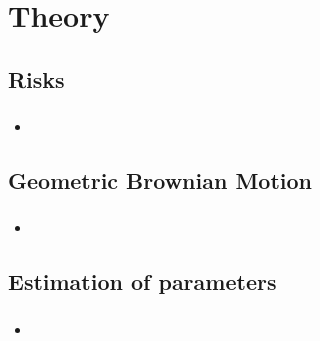\section{Theory}

\subsection{Risks}
\begin{frame}
\frametitle{\insertsection}
\textbf{\insertsubsection}
\begin{itemize}
	\item []
\end{itemize}

\centering
\end{frame}

\subsection{Geometric Brownian Motion}
\begin{frame}
\frametitle{\insertsection}
\textbf{\insertsubsection}
\begin{itemize}
	\item []
\end{itemize}
\end{frame}

\subsection{Estimation of parameters}
\begin{frame}
\frametitle{\insertsection}
\textbf{\insertsubsection}
\begin{itemize}
	\item []
\end{itemize}
\end{frame}
